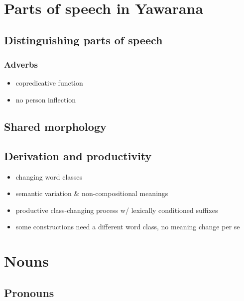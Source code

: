 \documentclass{memoir}
\begin{document}
\chapter{\texorpdfstring{Parts of speech in Yawarana
\label{POS}}{Parts of speech in Yawarana }}

\section{Distinguishing parts of speech}

\subsection{Adverbs}

\begin{itemize}
\tightlist
\item
  copredicative function
\item
  no person inflection
\end{itemize}

\section{Shared morphology}

\section{Derivation and productivity}

\begin{itemize}
\tightlist
\item
  changing word classes
\item
  semantic variation \& non-compositional meanings
\item
  productive class-changing process w/ lexically conditioned suffixes
\item
  some constructions need a different word class, no meaning change per
  se
\end{itemize}

\chapter{\texorpdfstring{Nouns \label{nouns}}{Nouns }}

\section{\texorpdfstring{Pronouns \label{sec:pronouns}}{Pronouns }}
\end{document}
